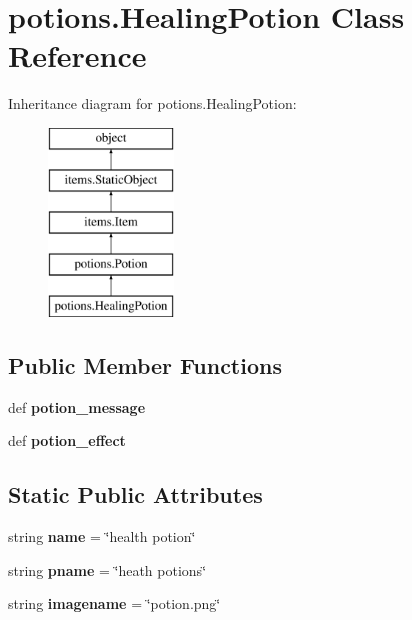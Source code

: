 \hypertarget{classpotions_1_1_healing_potion}{}\section{potions.\+Healing\+Potion Class Reference}
\label{classpotions_1_1_healing_potion}
Inheritance diagram for potions.\+Healing\+Potion\+:\begin{figure}[H]
\begin{center}
\leavevmode
\includegraphics[height=5.000000cm]{classpotions_1_1_healing_potion}
\end{center}
\end{figure}
\subsection*{Public Member Functions}
\begin{DoxyCompactItemize}
\item 
\hypertarget{classpotions_1_1_healing_potion_a365d9539d194fbc08325b9010aa73abb}{}def {\bfseries potion\+\_\+message}\label{classpotions_1_1_healing_potion_a365d9539d194fbc08325b9010aa73abb}

\item 
\hypertarget{classpotions_1_1_healing_potion_a32ba597c3b149fba05f2eec0532b2f2d}{}def {\bfseries potion\+\_\+effect}\label{classpotions_1_1_healing_potion_a32ba597c3b149fba05f2eec0532b2f2d}

\end{DoxyCompactItemize}
\subsection*{Static Public Attributes}
\begin{DoxyCompactItemize}
\item 
\hypertarget{classpotions_1_1_healing_potion_af1cb6e57335c8f801f78361f91bac1dd}{}string {\bfseries name} = \char`\"{}health potion\char`\"{}\label{classpotions_1_1_healing_potion_af1cb6e57335c8f801f78361f91bac1dd}

\item 
\hypertarget{classpotions_1_1_healing_potion_a159a26566e68c13245d828df4f3b695c}{}string {\bfseries pname} = \char`\"{}heath potions\char`\"{}\label{classpotions_1_1_healing_potion_a159a26566e68c13245d828df4f3b695c}

\item 
\hypertarget{classpotions_1_1_healing_potion_aa41cc5525f75f67f62a16e6342c36b22}{}string {\bfseries imagename} = \char`\"{}potion.\+png\char`\"{}\label{classpotions_1_1_healing_potion_aa41cc5525f75f67f62a16e6342c36b22}

\end{DoxyCompactItemize}
